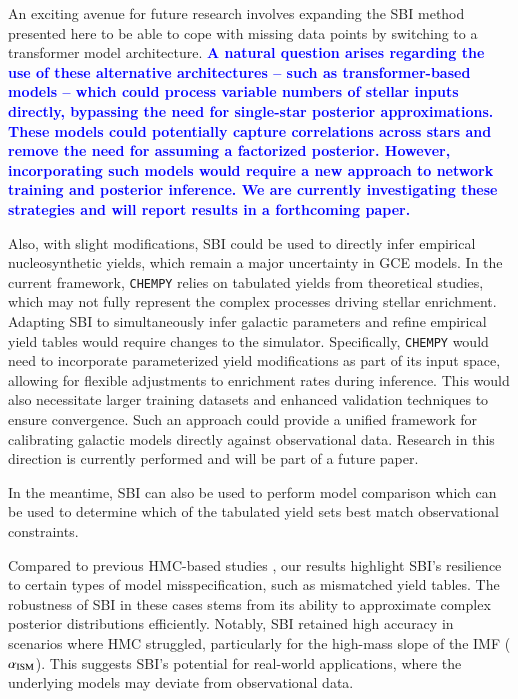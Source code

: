 \documentclass{aa}
\newcommand{\resub}[1]{\textbf{\textcolor{blue}{#1}}}
\begin{document}
An exciting avenue for future research involves expanding the SBI method presented here to be able to cope with missing data points by switching to a transformer model architecture.
\resub{A natural question arises regarding the use of these alternative architectures -- such as transformer-based models -- which could process variable numbers of stellar inputs directly, bypassing the need for single-star posterior approximations. These models could potentially capture correlations across stars and remove the need for assuming a factorized posterior. However, incorporating such models would require a new approach to network training and posterior inference. We are currently investigating these strategies and will report results in a forthcoming paper.}

Also, with slight modifications, SBI could be used 
to directly infer empirical nucleosynthetic yields, which remain a major uncertainty in GCE models. In the current framework, \texttt{CHEMPY} relies on tabulated yields from theoretical studies, which may not fully represent the complex processes driving stellar enrichment. Adapting SBI to simultaneously infer galactic parameters and refine empirical yield tables would require changes to the simulator. Specifically, \texttt{CHEMPY} would need to incorporate parameterized yield modifications as part of its input space, allowing for flexible adjustments to enrichment rates during inference. This would also necessitate larger training datasets and enhanced validation techniques to ensure convergence. Such an approach could provide a unified framework for calibrating galactic models directly against observational data. Research in this direction is currently performed and will be part of a future paper.

In the meantime, SBI can also be used to perform model comparison \citep[e.g.][]{model_comp,zhou2024} which can be used to determine which of the tabulated yield sets best match observational constraints. 

Compared to previous HMC-based studies \citep[e.g.][]{Philcox_2019}, our results highlight SBI's resilience to certain types of model misspecification, such as mismatched yield tables. The robustness of SBI in these cases stems from its ability to approximate complex posterior distributions efficiently. Notably, SBI retained high accuracy in scenarios where HMC struggled, particularly for the high-mass slope of the IMF ($\alpha_{\rm ISM}$). This suggests SBI's potential for real-world applications, where the underlying models may deviate from observational data.
\end{document}
